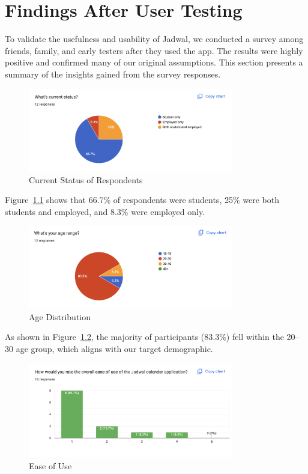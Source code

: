 \chapter{Findings After User Testing}

To validate the usefulness and usability of Jadwal, we conducted a survey among friends, family, and early testers after they used the app. The results were highly positive and confirmed many of our original assumptions. This section presents a summary of the insights gained from the survey responses.

\begin{figure}[H]
\centering
\includegraphics[width=0.8\textwidth]{images/end-survey/01-current-status.png}
\caption{Current Status of Respondents}
\label{fig:current-status}
\end{figure}

Figure~\ref{fig:current-status} shows that 66.7\% of respondents were students, 25\% were both students and employed, and 8.3\% were employed only.

\begin{figure}[H]
\centering
\includegraphics[width=0.8\textwidth]{images/end-survey/02-age-range.png}
\caption{Age Distribution}
\label{fig:age-range}
\end{figure}

As shown in Figure~\ref{fig:age-range}, the majority of participants (83.3\%) fell within the 20–30 age group, which aligns with our target demographic.

\begin{figure}[H]
\centering
\includegraphics[width=0.8\textwidth]{images/end-survey/03-ease-of-use.png}
\caption{Ease of Use}
\label{fig:ease-of-use}
\end{figure}


